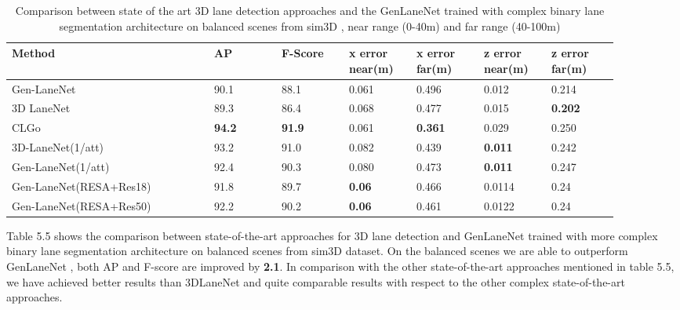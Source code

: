     \begin{table}[htbp]
    \addtolength{\tabcolsep}{-1pt}
    \begin{center}
    \caption{Comparison between state of the art 3D lane detection approaches and the GenLaneNet \cite{guo2020gen} trained with complex binary lane segmentation architecture on balanced scenes from sim3D \cite{guo2020gen}, near range (0-40m) and far range (40-100m)\cite{guo2020gen}}
    \begin{tabular}{|p{0.3\linewidth}|p{0.1\linewidth}|p{0.1\linewidth}|p{0.1\linewidth}|p{0.1\linewidth}|p{0.1\linewidth}|p{0.1\linewidth}|}
    \hline
        \textbf{Method} & \textbf{AP} & \textbf{F-Score} & \textbf{x error near(m)} & \textbf{x error far(m)} & \textbf{z error near(m)} & \textbf{z error far(m)} \\ \hline
        Gen-LaneNet\cite{guo2020gen} & 90.1 & 88.1 & 0.061 & 0.496 & 0.012 & 0.214 \\ \hline
        3D LaneNet \cite{DBLP:journals/corr/abs-1811-10203}& 89.3 & 86.4 & 0.068 & 0.477 & 0.015 & \textbf{0.202} \\ \hline
        CLGo \cite{DBLP:journals/corr/abs-2112-15351}& \textbf{94.2} &\textbf{ 91.9} & 0.061 & \textbf{0.361} & 0.029 & 0.250 \\ \hline
        3D-LaneNet(1/att) \cite{9506296} &  93.2 & 91.0 & 0.082 & 0.439 & \textbf{0.011} & 0.242 \\ \hline
        Gen-LaneNet(1/att) \cite{9506296}& 92.4 & 90.3 & 0.080 & 0.473 & \textbf{0.011} & 0.247 \\ \hline
        Gen-LaneNet(RESA+Res18) & 91.8 & 89.7 & \textbf{0.06} & 0.466 & 0.0114 & 0.24 \\ \hline
        Gen-LaneNet(RESA+Res50) & 92.2 & 90.2 &\textbf{ 0.06} & 0.461 & 0.0122 & 0.24 \\ \hline
    \end{tabular}
    \end{center}
    \end{table}
    
    Table 5.5 shows the comparison between state-of-the-art approaches for 3D lane detection and GenLaneNet \cite{guo2020gen} trained with more complex binary lane segmentation architecture on balanced scenes from sim3D dataset\cite{guo2020gen}. On the balanced scenes we are able to outperform GenLaneNet \cite{guo2020gen}, both AP and F-score are improved by \textbf{2.1}. In comparison with the other state-of-the-art approaches mentioned in table 5.5, we have achieved better results than 3DLaneNet \cite{DBLP:journals/corr/abs-1811-10203} and quite comparable results with respect to the other complex state-of-the-art approaches. 
        

